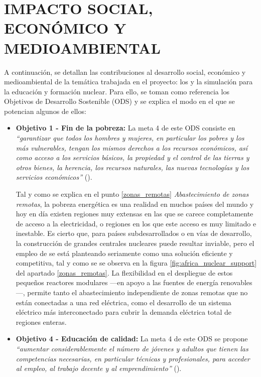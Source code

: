 \newpage
\section{IMPACTO SOCIAL, ECONÓMICO Y MEDIOAMBIENTAL} \label{impacto}

A continuación, se detallan las contribuciones al desarrollo social, económico y medioambiental de la temática trabajada en el proyecto: los  y la simulación para la educación y formación nuclear. Para ello, se toman como referencia los Objetivos de Desarrollo Sostenible (ODS) y se explica el modo en el que se potencian algunos de ellos:

\begin{itemize}
    \item \textbf{Objetivo 1 - Fin de la pobreza:} La meta 4 de este ODS consiste en \textit{``garantizar que todos los hombres y mujeres, en particular los pobres y los más vulnerables, tengan los mismos derechos a los recursos económicos, así como acceso a los servicios básicos, la propiedad y el control de las tierras y otros bienes, la herencia, los recursos naturales, las nuevas tecnologías y los servicios económicos''} (\cite{ODS}).
    
    Tal y como se explica en el punto \ref{zonas_remotas} \textit{Abastecimiento de zonas remotas}, la pobreza energética es una realidad en muchos países del mundo y hoy en día existen regiones muy extensas en las que se carece completamente de acceso a la electricidad, o regiones en los que este acceso es muy limitado e inestable. Es cierto que, para países subdesarrollados o en vías de desarrollo, la construcción de grandes centrales nucleares puede resultar inviable, pero el empleo de  se está planteando seriamente como una solución eficiente y competitiva, tal y como se se observa en la figura \ref{fig:africa_nuclear_support} del apartado \ref{zonas_remotas}. La flexibilidad en el despliegue de estos pequeños reactores modulares ---en apoyo a las fuentes de energía renovables---, permite tanto el abastecimiento independiente de zonas remotas que no están conectadas a una red eléctrica, como el desarrollo de un sistema eléctrico más interconectado para cubrir la demanda eléctrica total de regiones enteras.

    \item \textbf{Objetivo 4 - Educación de calidad:} La meta 4 de este ODS se propone \textit{``aumentar considerablemente el número de jóvenes y adultos que tienen las competencias necesarias, en particular técnicas y profesionales, para acceder al empleo, al trabajo decente y al emprendimiento''} (\cite{ODS}).
    

\end{itemize}
